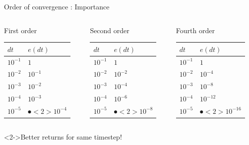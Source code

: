 \documentclass[presentation]{beamer}
\begin{document}
\begin{frame}[label={sec:org9c5e357}]{Order of convergence : Importance}
\begin{columns}
\begin{column}{0.32\columnwidth}
\begin{block}{First order}
\begin{center}
\begin{tabular}{ll}
\toprule
\(dt\) & \(e(dt)\)\\
\midrule
\(10^{-1}\) & \(1\)\\
\(10^{-2}\) & \(10^{-1}\)\\
\(10^{-3}\) & \(10^{-2}\)\\
\(10^{-4}\) & \(10^{-3}\)\\
\(10^{-5}\) & \(\spot<2>{10^{-4}}\)\\
\bottomrule
\end{tabular}
\end{center}
\end{block}
\end{column}

\begin{column}{0.32\columnwidth}
\begin{block}{Second order}
\begin{center}
\begin{tabular}{ll}
\toprule
\(dt\) & \(e(dt)\)\\
\midrule
\(10^{-1}\) & \(1\)\\
\(10^{-2}\) & \(10^{-2}\)\\
\(10^{-3}\) & \(10^{-4}\)\\
\(10^{-4}\) & \(10^{-6}\)\\
\(10^{-5}\) & \(\spot<2>{10^{-8}}\)\\
\bottomrule
\end{tabular}
\end{center}
\end{block}
\end{column}
\begin{column}{0.32\columnwidth}
\begin{block}{Fourth order}
\begin{center}
\begin{tabular}{ll}
\toprule
\(dt\) & \(e(dt)\)\\
\midrule
\(10^{-1}\) & \(1\)\\
\(10^{-2}\) & \(10^{-4}\)\\
\(10^{-3}\) & \(10^{-8}\)\\
\(10^{-4}\) & \(10^{-12}\)\\
\(10^{-5}\) & \(\spot<2>{10^{-16}}\)\\
\bottomrule
\end{tabular}
\end{center}
\end{block}
\end{column}
\end{columns}
\begin{alertblock}<2->{Better returns for same timestep!}
\end{alertblock}
\end{frame}
\end{document}
